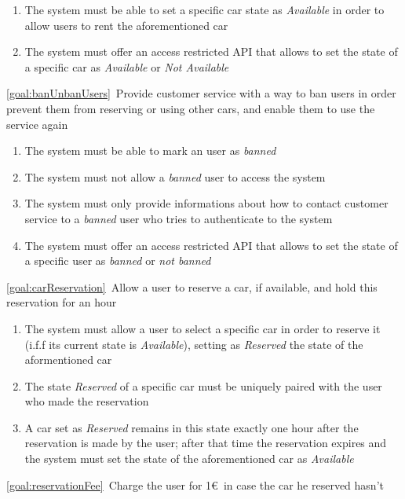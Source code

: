 \begin{description}
			\begin{enumerate}[resume*]
   				\item The system must be able to set a specific car state as \emph{Available} in order to
   				allow users to rent the aforementioned car
   				\item The system must offer an access restricted API that allows to set the state of a
   				specific car as \emph{Available} or \emph{Not Available}
  			\end{enumerate}
  		\item \ref{goal:banUnbanUsers}\ Provide customer service with a way to ban users in order
  		prevent them from reserving or using other cars, and enable them to use the service again
  			\begin{enumerate}[resume*]
  				\item The system must be able to mark an user as \emph{banned}
  				\item The system must not allow a \emph{banned} user to access the system
   				\item The system must only provide informations about how to contact customer service
   				to a \emph{banned} user who tries to authenticate to the system
   				\item The system must offer an access restricted API that allows to set the state of a
   				specific user as \emph{banned} or \emph{not banned}
   			\end{enumerate}
 	  	\item \ref{goal:carReservation}\ Allow a user to reserve a car, if available, and hold this
 	  	reservation for an hour
 	  		\begin{enumerate}[resume*]
 	  			\item The system must allow a user to select a specific car in order to reserve it 
 	  			(i.f.f its current state is \emph{Available}), setting as \emph{Reserved} the state of the
 	  			aformentioned car
 	  			\item The state \emph{Reserved} of a specific car must be uniquely paired with the user
 	  			who made the reservation
 	  			\item A car set as \emph{Reserved} remains in this state exactly one hour after the
 	  			reservation is made by the user; after that time the reservation expires and the system
 	  			must set the state of the aforementioned car as \emph{Available}
   			\end{enumerate}
  		\item \ref{goal:reservationFee}\ Charge the user for 1\euro\ in case the car he reserved hasn't

\end{description}
